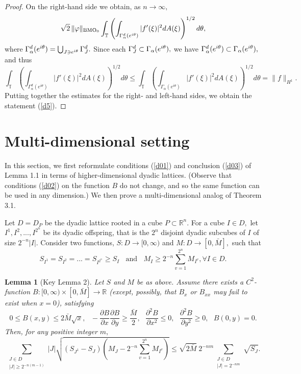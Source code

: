 \documentclass[psamsfonts]{conm-p-l}
\newtheorem{lemma}[theorem]{Lemma}
\theoremstyle{definition}
\theoremstyle{remark}
\numberwithin{equation}{section}
\begin{document}
\begin{proof}
On the right-hand side we obtain, as $n\to\infty,$ 
$$
\sqrt2\,\|\varphi\|_{{{\rm{BMO}}}_0}
\int_\mathbb{T}\left(\int_{\Gamma^d_\alpha(e^{{i\theta}})}|f'(\xi)|^2dA(\xi)\right)^{1/2}d\theta,
$$
where ${\displaystyle} \Gamma^d_\alpha(e^{{i\theta}})=\bigcup_{J\ni e^{i\theta}}\Gamma^d_J.$ Since each 
${\displaystyle} \Gamma^d_J\subset \Gamma_\alpha(e^{i\theta}),$ we have 
${\displaystyle} \Gamma^d_\alpha(e^{i\theta})\subset \Gamma_\alpha(e^{i\theta}),$ and thus
$$
\int_\mathbb{T}\left(\int_{\Gamma^d_\alpha(e^{{i\theta}})}|f'(\xi)|^2dA(\xi)\right)^{1/2}d\theta\le
\int_\mathbb{T}\left(\int_{\Gamma_\alpha(e^{{i\theta}})}|f'(\xi)|^2dA(\xi)\right)^{1/2}d\theta=\| f\|_{H^1}.
$$
Putting together the estimates for the right- and left-hand sides, we obtain the statement (\ref{d5}).
\end{proof}
\section{Multi-dimensional setting} 
In this section, we first reformulate conditions (\ref{d01}) and conclusion (\ref{d03}) of Lemma 1.1 in terms of higher-dimensional dyadic lattices. (Observe that conditions (\ref{d02}) on the function $B$ do not change, and so the same function can be used in any dimension.) We then prove a multi-dimensional analog of Theorem 3.1.

Let $D=D_{P}$ be the dyadic lattice rooted in a cube $P\subset \mathbb{R}^n.$ For a cube $I\in D,$ let $I^1,I^2,...,I^{2^n}$ be its dyadic offspring, that is the $2^n$ disjoint dyadic subcubes of $I$ of size $2^{-n}|I|$.  Consider two functions, $S: D\to [0,\infty)$ and $M: D\to [0,\bar{M}],$ such that 
{\begin{equation}\label{d001}{
S_{I^1}=S_{I^2}=...=S_{I^{2^n}}\ge S_I~~~~\text{and}~~~~ 
M_I\ge 2^{-n}\sum_{v=1}^{2^n}M_{I^v},\forall I\in D. 
}\end{equation}}
\begin{lemma}[Key Lemma 2]Let $S$ and $M$ be as above. Assume there exists a $C^2\!\!$-function $B: [0,\infty)\times [0,\bar{M}]\to \mathbb{R}$ (except, possibly, that $B_x$ or $B_{xx}$ may fail to exist when $x=0$), satisfying
{\begin{equation}\label{d002}{
0\le B(x,y)\le 2\bar{M}\sqrt{x},~~~
-\frac{{{\partial}\!} B}{{\partial} x}\frac{{{\partial}\!} B}{{\partial} y}\ge \frac{\bar{M}}2,~~~
\frac{{\partial}^2\! B}{{\partial} x^2}\le 0,~~~\frac{{\partial}^2\! B}{{\partial} y^2}\ge 0,~~~B(0,y)=0.
}\end{equation}}
Then, for any positive integer $m,$
{\begin{equation}\label{d003}{
\sum_
{\substack{ 
J\in D\\
|J|\ge2^{-n(m-1)} 
}}
|J|\sqrt{(S_{J^1}-S_J)\left(M_J-2^{-n}\sum_{v=1}^{2^n}M_{I^v}\right)}
\le
\sqrt{2\bar{M}}~2^{-nm}\!\!\!\!
\sum_
{\substack{ 
J\in D\\
|J|=2^{{-nm}} 
}}
\sqrt{S_J}.
}\end{equation}}
\end{lemma}
\end{document}
